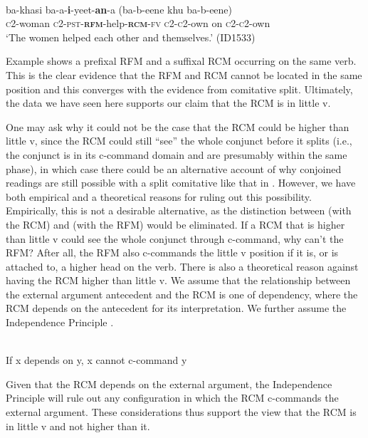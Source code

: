 \documentclass[output=paper]{langsci/langscibook}
\begin{document}
\ea\label{ex:}
  \\
\gll ba-khasi   ba-a-\textbf{i}-yeet-\textbf{an}-a     (ba-b-eene khu ba-b-eene) \\
\textsc{c}2-woman   \textsc{c2-pst-}\textbf{\textsc{rfm}}-help-\textbf{\textsc{rcm}}\textsc{-fv}   \textsc{c2-c}2-own on  \textsc{c2-c2}-own\\
\glt ‘The women helped each other and themselves.’ (ID1533)
\z


Example  shows a prefixal RFM and a suffixal RCM occurring on the same verb. This is the clear evidence that the RFM and RCM cannot be located in the same position and this converges with the evidence from comitative split. Ultimately, the data we have seen here supports our claim that the RCM is in little v. 

One may ask why it could not be the case that the RCM could be higher than little v, since the RCM could still “see” the whole conjunct before it splits (i.e., the conjunct is in its c-command domain and are presumably within the same phase), in which case there could be an alternative account of why conjoined readings are still possible with a split comitative like that in . However, we have both empirical and a theoretical reasons for ruling out this possibility. Empirically, this is not a desirable alternative, as the distinction between  (with the RCM) and  (with the RFM) would be eliminated. If a RCM that is higher than little v could see the whole conjunct through c-command, why can't the RFM? After all, the RFM also c-commands the little v position if it is, or is attached to, a higher head on the verb. There is also a theoretical reason against having the RCM higher than little v. We assume that the relationship between the external argument antecedent and the RCM is one of dependency, where the RCM depends on the antecedent for its interpretation. We further assume the Independence Principle \citep{Safir2004}. 


\ea\label{ex:}
\\
  If x depends on y, x cannot c-command y
\z

Given that the RCM depends on the external argument, the Independence Principle will rule out any configuration in which the RCM c-commands the external argument. These considerations thus support the view that the RCM is in little v and not higher than it. 
\end{document}
